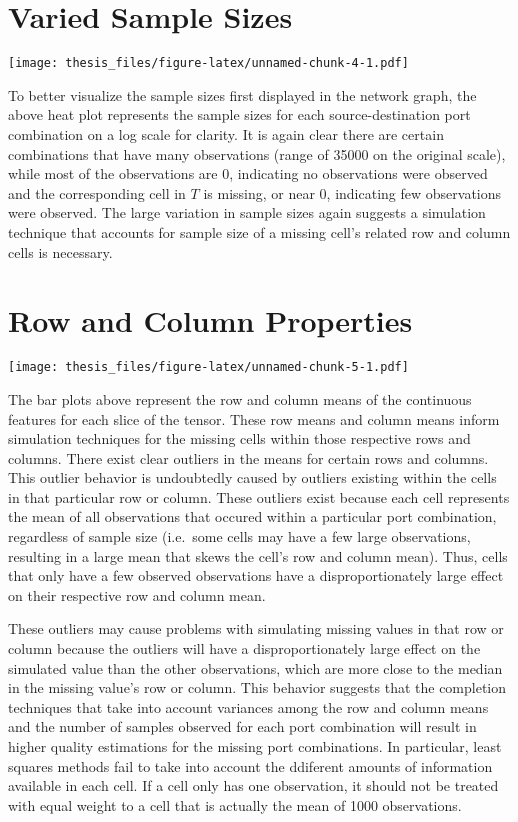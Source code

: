 \documentclass[12pt,twoside]{dukestatscithesis}
\theoremstyle{definition}
\theoremstyle{definition}
\theoremstyle{definition}
\theoremstyle{remark}
\begin{document}
\section{Varied Sample Sizes}\label{varied-sample-sizes}

\texttt{[image: thesis\_files/figure-latex/unnamed-chunk-4-1.pdf]}

To better visualize the sample sizes first displayed in the network
graph, the above heat plot represents the sample sizes for each
source-destination port combination on a log scale for clarity. It is
again clear there are certain combinations that have many observations
(range of 35000 on the original scale), while most of the observations
are 0, indicating no observations were observed and the corresponding
cell in \(T\) is missing, or near 0, indicating few observations were
observed. The large variation in sample sizes again suggests a
simulation technique that accounts for sample size of a missing cell's
related row and column cells is necessary.

\section{Row and Column Properties}\label{row-and-column-properties}

\texttt{[image: thesis\_files/figure-latex/unnamed-chunk-5-1.pdf]}

The bar plots above represent the row and column means of the continuous
features for each slice of the tensor. These row means and column means
inform simulation techniques for the missing cells within those
respective rows and columns. There exist clear outliers in the means for
certain rows and columns. This outlier behavior is undoubtedly caused by
outliers existing within the cells in that particular row or column.
These outliers exist because each cell represents the mean of all
observations that occured within a particular port combination,
regardless of sample size (i.e.~some cells may have a few large
observations, resulting in a large mean that skews the cell's row and
column mean). Thus, cells that only have a few observed observations
have a disproportionately large effect on their respective row and
column mean.

These outliers may cause problems with simulating missing values in that
row or column because the outliers will have a disproportionately large
effect on the simulated value than the other observations, which are
more close to the median in the missing value's row or column. This
behavior suggests that the completion techniques that take into account
variances among the row and column means and the number of samples
observed for each port combination will result in higher quality
estimations for the missing port combinations. In particular, least
squares methods fail to take into account the ddiferent amounts of
information available in each cell. If a cell only has one observation,
it should not be treated with equal weight to a cell that is actually
the mean of 1000 observations.
\end{document}
